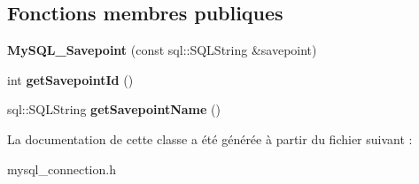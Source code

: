 \subsection*{Fonctions membres publiques}
\begin{DoxyCompactItemize}
\item 
{\bfseries My\+S\+Q\+L\+\_\+\+Savepoint} (const sql\+::\+S\+Q\+L\+String \&savepoint)\hypertarget{classsql_1_1mysql_1_1MySQL__Savepoint_a864a5455837699c737623060010dd7b5}{}\label{classsql_1_1mysql_1_1MySQL__Savepoint_a864a5455837699c737623060010dd7b5}

\item 
int {\bfseries get\+Savepoint\+Id} ()\hypertarget{classsql_1_1mysql_1_1MySQL__Savepoint_a0fb4031dfa691e3f2453c2d9eff5ea09}{}\label{classsql_1_1mysql_1_1MySQL__Savepoint_a0fb4031dfa691e3f2453c2d9eff5ea09}

\item 
sql\+::\+S\+Q\+L\+String {\bfseries get\+Savepoint\+Name} ()\hypertarget{classsql_1_1mysql_1_1MySQL__Savepoint_a7c2aeca2f1c37da2ae0fe213eb9e6b40}{}\label{classsql_1_1mysql_1_1MySQL__Savepoint_a7c2aeca2f1c37da2ae0fe213eb9e6b40}

\end{DoxyCompactItemize}


La documentation de cette classe a été générée à partir du fichier suivant \+:\begin{DoxyCompactItemize}
\item 
mysql\+\_\+connection.\+h\end{DoxyCompactItemize}
